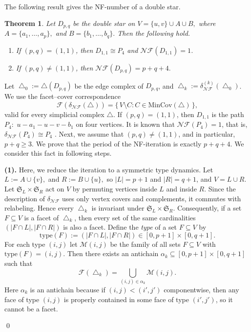 \documentclass[12pt]{article}
\renewenvironment{proof}{{\noindent\bfseries Proof.}}{\qed}
\theoremstyle{plain}
\newtheorem{theorem}{Theorem}[section]
\theoremstyle{definition}
\newcommand{\F}{\mathcal{F}}
\newcommand{\MIN}{\mathrm{MinCov}}
\begin{document}
		\medskip
		 The following result gives the NF-number of a double star.
		 \begin{theorem}\label{thm:NFnumber-double-star}
			Let \(D_{p,q}\) be the double star  on $V=\{u,v\}\cup A\cup B,$
			where $A=\{a_1,\dots,a_p\},$ and $B=\{b_1,\dots,b_q\}.$
			Then the following hold.
			\begin{enumerate}%
				\item If \((p,q)=(1,1)\), then \(D_{1,1}\cong P_4\) and \(\mathcal{NF}(D_{1,1})=1\).
				\item If \((p,q)\neq (1,1)\), then $\mathcal{NF}(D_{p,q})=p+q+4.$ 
			\end{enumerate}
		\end{theorem}
		
		\begin{proof}
			Let \(\bigtriangleup_0:=\bigtriangleup(D_{p,q})\) be the edge complex of \(D_{p,q}\), and \(\bigtriangleup_k:=\delta_{\mathcal{NF}}^{(k)}(\bigtriangleup_0)\).
			We use the facet--cover correspondence
			\begin{equation}\label{eq:facets-complements-double-star}
				\F(\delta_{\mathcal{NF}}(\bigtriangleup))=\{\,V\setminus C: C\in \MIN(\bigtriangleup)\,\},
			\end{equation}
			valid for every simplicial complex \(\bigtriangleup\).
			 If \((p,q)=(1,1)\), then \(D_{1,1}\) is the path $P_{4}:$ \(u-a_1-u-v-b_1\) on four vertices. 	It is known that \(\mathcal{NF}(P_4)=1\), that is, \(\delta_{\mathcal{NF}}(P_4)\cong P_4\) \cite{HibiMahmood2020}.
			 Next, we assume that \((p,q)\neq(1,1)\), and in particular, \(p+q\ge 3\). We prove that the period of the NF-iteration is exactly \(p+q+4\). We consider this fact in following steps.
			
			\smallskip\noindent
			\textbf{(1).} Here, we reduce the iteration to a symmetric type dynamics. 	Let $L:=A\cup\{v\},$ and $R:=B\cup\{u\},$
			so \(|L|=p+1\) and \(|R|=q+1\), and \(V=L\cup R\).
			Let \(\mathfrak{S}_L\times \mathfrak{S}_R\) act on \(V\) by permuting vertices inside \(L\) and inside \(R\).
			Since the description of \(\delta_{\mathcal{NF}}\) uses only vertex covers and complements, it commutes with relabeling. Hence every \(\bigtriangleup_k\) is invariant under \(\mathfrak{S}_L\times \mathfrak{S}_R\).
			Consequently, if a set \(F\subseteq V\) is a facet of \(\bigtriangleup_k\), then every set of the same cardinalities $(|F\cap L|, |F\cap R|)$ is also a facet.
			Define the \emph{type} of a set \(F\subseteq V\) by
			\[
			\mathrm{type}(F):=(|F\cap L|, |F\cap R|)\in [0,p+1]\times[0,q+1].
			\]
			For each type \((i,j)\) let \(\mathcal{M}(i,j)\) be the family of all sets \(F\subseteq V\) with \( \mathrm{type}(F)=(i,j)\).
			Then there exists an antichain \(\alpha_k\subseteq [0,p+1]\times[0,q+1]\) such that
			\begin{equation}\label{eq:facets-type-union}
				\F(\bigtriangleup_k)=\bigcup_{(i,j)\in \alpha_k}\mathcal{M}(i,j).
			\end{equation}
			Here \(\alpha_k\) is an antichain because if \((i,j)<(i',j')\) componentwise, then any face of type \((i,j)\)
			is properly contained in some face of type \((i',j')\), so it cannot be a facet.
			

\end{proof}
\end{document}
